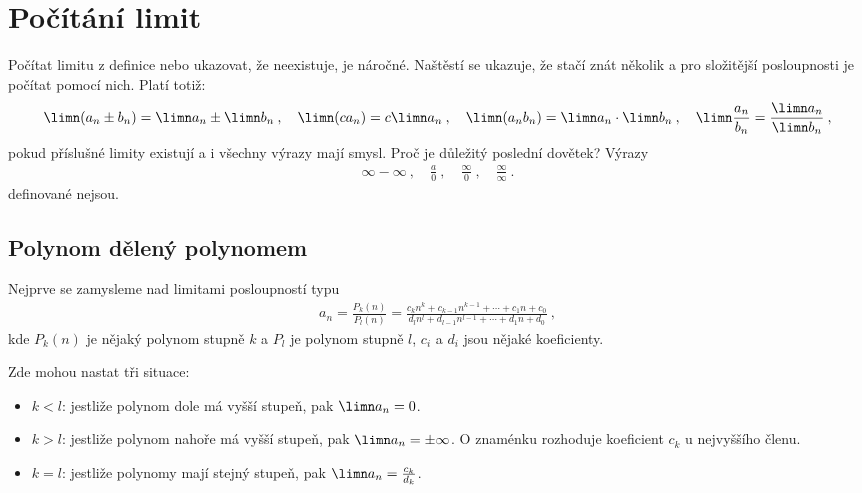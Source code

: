 \section*{Počítání limit}

Počítat limitu z definice nebo ukazovat, že neexistuje, je náročné. Naštěstí se ukazuje, že stačí znát několik  a pro složitější posloupnosti je počítat pomocí nich. Platí totiž:
\begin{align}
    \limn (a_n \pm b_n) = \limn a_n \pm \limn b_n \:, \quad
    \limn (ca_n) = c \limn a_n \:, \quad
    \limn (a_n b_n) = \limn a_n \cdot \limn b_n \:, \quad
    \limn \frac{a_n}{b_n} = \frac{\limn a_n}{\limn b_n} \:,
\end{align}
pokud příslušné limity existují a i všechny výrazy mají smysl. Proč je důležitý poslední dovětek? Výrazy 
\begin{align}
    \infty - \infty \:,\quad 
    \frac{a}{0} \:,\quad 
    \frac{\infty}{0} \:,\quad 
    \frac{\infty}{\infty} \:.
\end{align}
definované nejsou.

\subsection*{Polynom dělený polynomem}

Nejprve se zamysleme nad limitami posloupností typu
\begin{align}
    a_n = \frac{P_k(n)}{P_l(n)} = 
    \frac{c_k n^k + c_{k-1} n^{k-1} + \cdots + c_1 n + c_0}
    {d_l n^l + d_{l-1} n^{l-1} + \cdots + d_1 n + d_0}\:,
\end{align}
kde $P_k(n)$ je nějaký polynom stupně $k$ a $P_l$ je polynom stupně $l$, $c_i$ a $d_i$ jsou nějaké koeficienty.

Zde mohou nastat tři situace:
\begin{itemize}
    \item $k<l$: jestliže polynom dole má vyšší stupeň, pak $\limn a_n = 0$.
    \item $k>l$: jestliže polynom nahoře má vyšší stupeň, pak $\limn a_n = \pm \infty$. O znaménku rozhoduje koeficient $c_k$ u nejvyššího členu.
    \item $k=l$: jestliže polynomy mají stejný stupeň, pak $\limn a_n = \frac{c_k}{d_k}$.
\end{itemize}

